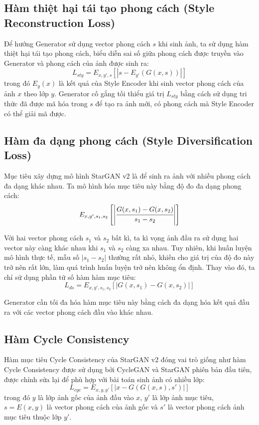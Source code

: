 \documentclass[12pt]{extreport}
\begin{document}
\subsection{Hàm thiệt hại tái tạo phong cách (Style Reconstruction Loss)}

Để hướng Generator sử dụng vector phong cách $ s $ khi sinh ảnh, ta sử dụng hàm thiệt hại tái tạo phong cách, biểu diễn sai số giữa phong cách được truyền vào Generator và phong cách của ảnh được sinh ra:
$$ L_{sty} = E_{x,y',s} [|s - E_{y'}(G(x, s))|] $$
trong đó $ E_{y}(x) $ là kết quả của Style Encoder khi sinh vector phong cách của ảnh $ x $ theo lớp $ y $. Generator cố gắng tối thiểu giá trị $ L_{sty} $ bằng cách sử dụng tri thức đã được mã hóa trong $ s $ để tạo ra ảnh mới, có phong cách mà Style Encoder có thể giải mã được.

\subsection{Hàm đa dạng phong cách (Style Diversification Loss)}

Mục tiêu xây dựng mô hình StarGAN v2 là để sinh ra ảnh với nhiều phong cách đa dạng khác nhau. Ta mô hình hóa mục tiêu này bằng độ đo đa dạng phong cách:
$$ E_{x,y',s_1,s_2} \left[\left|\cfrac{G(x,s_1) - G(x,s_2)}{s_1 - s_2}\right|\right] $$

Với hai vector phong cách $ s_1 $ và $ s_2 $ bất kì, ta kì vọng ảnh đầu ra sử dụng hai vector này càng khác nhau khi $ s_1 $ và $ s_2 $ càng xa nhau. Tuy nhiên, khi huấn luyện mô hình thực tế, mẫu số $ | s_1 - s_2 | $ thường rất nhỏ, khiến cho giá trị của độ đo này trở nên rất lớn, làm quá trình huấn luyện trở nên không ổn định. Thay vào đó, ta chỉ sử dụng phần tử số hàm hàm mục tiêu:
$$ L_{ds} = E_{x,y',s_1,s_2} \left[\left|G(x,s_1) - G(x,s_2)\right|\right] $$

Generator cần tối đa hóa hàm mục tiêu này bằng cách đa dạng hóa kết quả đầu ra với các vector phong cách đầu vào khác nhau.

\subsection{Hàm Cycle Consistency}

Hàm mục tiêu Cycle Consistency của StarGAN v2 đóng vai trò giống như hàm Cycle Consistency được sử dụng bởi CycleGAN và StarGAN phiên bản đầu tiên, được chỉnh sửa lại để phù hợp với bài toán sinh ảnh có nhiều lớp:
$$ L_{cyc} = E_{x, y, y'} [|x - G(G(x, s), s')|] $$
trong đó $ y $ là lớp ảnh gốc của ảnh đầu vào $ x $, $ y' $ là lớp ảnh mục tiêu, $ s = E(x, y) $ là vector phong cách của ảnh gốc và $ s' $ là vector phong cách ảnh mục tiêu thuộc lớp $ y' $.
\end{document}
